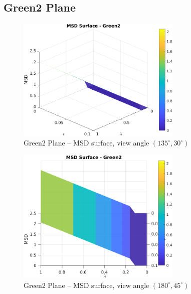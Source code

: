 \documentclass[11pt]{article}
\begin{document}
\subsection*{Green2 Plane}
\begin{figure}[h!]
\centering
\includegraphics[width=0.7\textwidth]{../utils/results/msd_surfaces/msd_surface_green2_angle_135_30.png}
\caption{Green2 Plane – MSD surface, view angle $(135^\circ, 30^\circ)$}
\end{figure}
\clearpage

\begin{figure}[h!]
\centering
\includegraphics[width=0.7\textwidth]{../utils/results/msd_surfaces/msd_surface_green2_angle_180_45.png}
\caption{Green2 Plane – MSD surface, view angle $(180^\circ, 45^\circ)$}
\end{figure}
\clearpage
\end{document}
